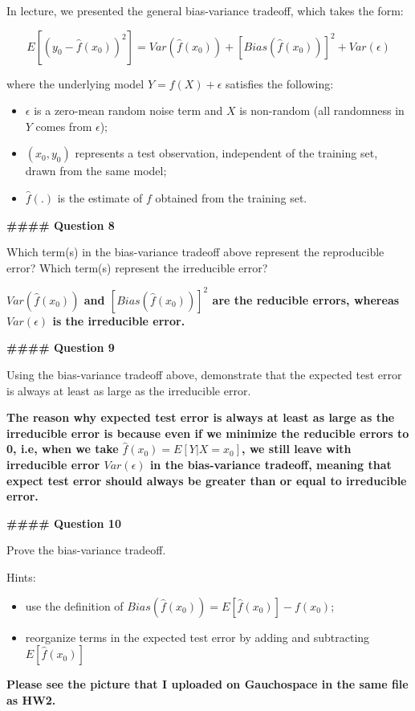 \documentclass[
]{article}
\providecommand{\tightlist}{%
  \setlength{\itemsep}{0pt}\setlength{\parskip}{0pt}}
\begin{document}
In lecture, we presented the general bias-variance tradeoff, which takes
the form:

\[
E[(y_0 - \hat{f}(x_0))^2]=Var(\hat{f}(x_0))+[Bias(\hat{f}(x_0))]^2+Var(\epsilon)
\]

where the underlying model \(Y=f(X)+\epsilon\) satisfies the following:

\begin{itemize}
\tightlist
\item
  \(\epsilon\) is a zero-mean random noise term and \(X\) is non-random
  (all randomness in \(Y\) comes from \(\epsilon\));
\item
  \((x_0, y_0)\) represents a test observation, independent of the
  training set, drawn from the same model;
\item
  \(\hat{f}(.)\) is the estimate of \(f\) obtained from the training
  set.
\end{itemize}

\textbf{\#\#\#\# Question 8}

Which term(s) in the bias-variance tradeoff above represent the
reproducible error? Which term(s) represent the irreducible error?

\textbf{\(Var(\hat{f}(x_0))\) and \([Bias(\hat{f}(x_0))]^2\) are the
reducible errors, whereas \(Var(\epsilon)\) is the irreducible error.}

\textbf{\#\#\#\# Question 9}

Using the bias-variance tradeoff above, demonstrate that the expected
test error is always at least as large as the irreducible error.

\textbf{The reason why expected test error is always at least as large
as the irreducible error is because even if we minimize the reducible
errors to 0, i.e, when we take} \(\hat{f}(x_0)=E[Y|X=x_0]\)\textbf{, we
still leave with irreducible error \(Var(\epsilon)\) in the
bias-variance tradeoff, meaning that expect test error should always be
greater than or equal to irreducible error.}

\textbf{\#\#\#\# Question 10}

Prove the bias-variance tradeoff.

Hints:

\begin{itemize}
\tightlist
\item
  use the definition of \(Bias(\hat{f}(x_0))=E[\hat{f}(x_0)]-f(x_0)\);
\item
  reorganize terms in the expected test error by adding and subtracting
  \(E[\hat{f}(x_0)]\)
\end{itemize}

\textbf{Please see the picture that I uploaded on Gauchospace in the
same file as HW2. }
\end{document}

